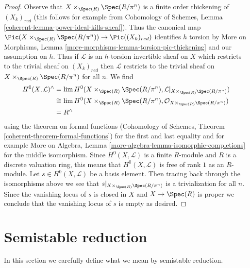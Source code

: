 \begin{proof}
Observe that $X \times_{\Spec(R)} \Spec(R/\pi^n)$ is a finite
order thickening of $(X_k)_{red}$ (this follows for example from
Cohomology of Schemes, Lemma \ref{coherent-lemma-power-ideal-kills-sheaf}).
Thus the canonical map
$\Pic(X \times_{\Spec(R)} \Spec(R/\pi^n)) \to \Pic((X_k)_{red})$
identifies $h$ torsion by
More on Morphisms, Lemma \ref{more-morphisms-lemma-torsion-pic-thickening}
and our assumption on $h$.
Thus if $\mathcal{L}$ is an $h$-torsion invertible sheaf on $X$
which restricts to the trivial sheaf on $(X_k)_{red}$ then
$\mathcal{L}$ restricts to the trivial sheaf on
$X \times_{\Spec(R)} \Spec(R/\pi^n)$ for all $n$.
We find
\begin{align*}
H^0(X, \mathcal{L})^\wedge
& =
\lim H^0(X \times_{\Spec(R)} \Spec(R/\pi^n),
\mathcal{L}|_{X \times_{\Spec(R)} \Spec(R/\pi^n)}) \\
& \cong
\lim H^0(X \times_{\Spec(R)} \Spec(R/\pi^n),
\mathcal{O}_{X \times_{\Spec(R)} \Spec(R/\pi^n)}) \\
& =
R^\wedge
\end{align*}
using the theorem on formal functions
(Cohomology of Schemes, Theorem \ref{coherent-theorem-formal-functions})
for the first and last equality and for example
More on Algebra, Lemma \ref{more-algebra-lemma-isomorphic-completions}
for the middle isomorphism. Since $H^0(X, \mathcal{L})$ is a finite
$R$-module and $R$ is a discrete valuation ring, this means that
$H^0(X, \mathcal{L})$ is free of rank $1$ as an $R$-module.
Let $s \in H^0(X, \mathcal{L})$ be a basis element.
Then tracing back through the isomorphisms above we see
that $s|_{X \times_{\Spec(R)} \Spec(R/\pi^n)}$ is a trivialization
for all $n$. Since the vanishing locus of $s$ is closed in $X$
and $X \to \Spec(R)$ is proper we conclude that the vanishing
locus of $s$ is empty as desired.
\end{proof}

\section{Semistable reduction}
\label{models-section-semistable-reduction}
In this section we carefully define what we mean by semistable reduction.

